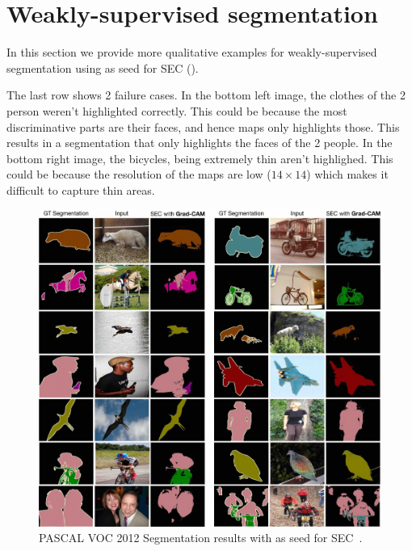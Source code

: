 \vspace{-20pt}
\section{Weakly-supervised segmentation}\label{sec:sup_segmentation}

In this section we provide more qualitative examples for weakly-supervised segmentation using \gcam{} as seed for SEC (\cite{seed_eccv16}).



The last row shows 2 failure cases. In the bottom left image, the clothes of the 2 person weren't highlighted correctly. This could be because the most discriminative parts are their faces, and hence \gcam{} maps only highlights those. This results in a segmentation that only highlights the faces of the 2 people. 
In the bottom right image, the bicycles, being extremely thin aren't highlighed. This could be because the resolution of the \gcam{} maps are low ($14 \times 14$) which makes it difficult to capture thin areas.

\begin{figure}[htp]
 \centering
 \includegraphics[width=1\linewidth]{figures/gcam_segmentation.jpg}
 \vspace{5pt}
 \caption{PASCAL VOC 2012 Segmentation results with \gcam{} as seed for SEC~\cite{seed_eccv16}.}
 \label{fig:segmentation}
\end{figure}
